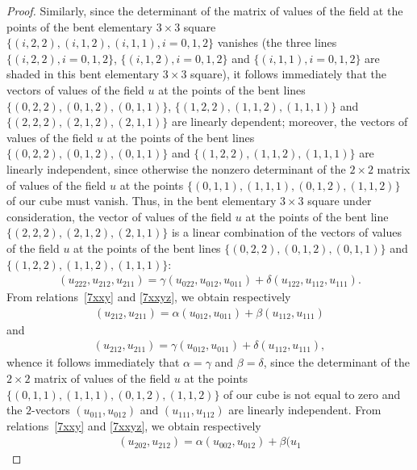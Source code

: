 \documentclass[pdftex]{sigma}
\begin{document}
\begin{proof}
Similarly, since the determinant of the matrix of values of the
f\/ield at the points of the bent ele\-mentary $3 \times 3$ square
$\{(i, 2, 2), (i, 1, 2), (i, 1, 1), i = 0, 1, 2\}$ vanishes (the
three lines $\{(i, 2, 2), i = 0, 1, 2\}$, $\{(i, 1, 2), i = 0, 1,
2\}$ and $\{(i, 1, 1), i = 0, 1, 2\}$ are shaded in this bent
elementary $3 \times 3$ square), it follows immediately that the
vectors of values of the f\/ield $u$ at the points of the bent lines
$\{(0, 2, 2), (0, 1, 2), (0, 1, 1)\}$, $\{(1, 2, 2), (1, 1, 2), (1,
1, 1)\}$ and $\{(2, 2, 2), (2, 1, 2), (2, 1, 1)\}$ are linearly
dependent; moreover, the vectors of values of the f\/ield $u$ at the
points of the bent lines $\{(0, 2, 2), (0, 1, 2), (0, 1, 1)\}$ and
$\{(1, 2, 2), (1, 1, 2), (1, 1, 1)\}$ are linearly independent,
since otherwise the nonzero determinant of the $2 \times 2$ matrix
of values of the f\/ield $u$ at the points $\{(0, 1, 1), (1, 1, 1),
(0, 1, 2), (1, 1, 2)\}$ of our cube must vanish. Thus, in the bent
elementary $3 \times 3$ square under consideration, the vector of
values of the f\/ield $u$ at the points of the bent line $\{(2, 2, 2),
(2, 1, 2), (2, 1, 1)\}$ is a linear combination of the vectors of
values of the f\/ield $u$ at the points of the bent lines $\{(0, 2,
2), (0, 1, 2), (0, 1, 1)\}$ and $\{(1, 2, 2), (1, 1, 2), (1, 1,
1)\}$:
\begin{gather}
(u_{2 2 2}, u_{2 1 2}, u_{2 1 1}) = \gamma (u_{0 2 2},
u_{0 1 2}, u_{0 1 1}) + \delta (u_{1 2 2}, u_{1 1 2}, u_{1 1 1}).
\label{7xxyz}
\end{gather} From relations~\eqref{7xxy} and \eqref{7xxyz}, we
obtain respectively
\begin{gather*} (u_{2 1 2}, u_{2 1 1}) = \alpha (u_{0 1 2},
u_{0 1 1}) + \beta (u_{1 1 2}, u_{1 1 1}) %
\end{gather*} and
\begin{gather*}
(u_{2 1 2}, u_{2 1 1}) = \gamma (u_{0 1 2}, u_{0 1 1}) + \delta
(u_{1 1 2}, u_{1 1 1}), %
\end{gather*} whence it follows
immediately that $\alpha = \gamma$ and $\beta = \delta$, since the
determinant of the $2 \times 2$ matrix of values of the f\/ield $u$ at
the points $\{(0, 1, 1), (1, 1, 1), (0, 1, 2), (1, 1, 2)\}$ of our
cube is not equal to zero and the $2$-vectors $(u_{0 1 1}, u_{0 1
2})$ and $(u_{1 1 1}, u_{1 1 2})$ are linearly independent. From
relations~\eqref{7xxy} and \eqref{7xxyz}, we obtain respectively \begin{gather}
(u_{2 0 2}, u_{2 1 2}) = \alpha (u_{0 0 2}, u_{0 1 2}) + \beta (u_{1
}
\end{gather}
\end{proof}
\end{document}
